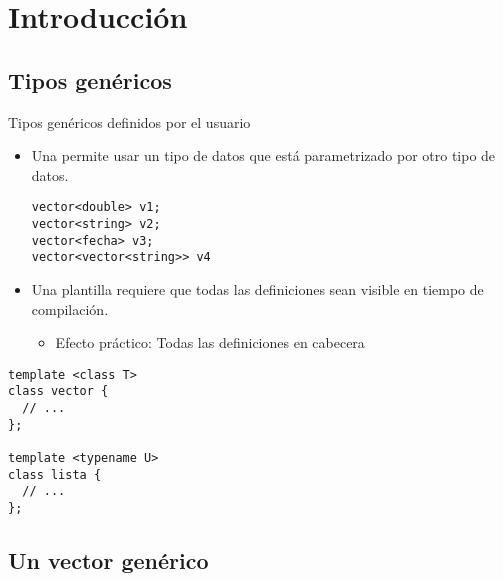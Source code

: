 \section{Introducción}

\subsection{Tipos genéricos}

\begin{frame}[fragile]{Tipos genéricos definidos por el usuario}
\vspace{-0.75em}
\begin{itemize}
  \item Una  permite usar un tipo de datos que está
        parametrizado por otro tipo de datos.
\begin{lstlisting}
vector<double> v1;
vector<string> v2;
vector<fecha> v3;
vector<vector<string>> v4
\end{lstlisting}
  \item Una plantilla requiere que todas las definiciones sean visible en
        tiempo de compilación.
    \begin{itemize}
      \item Efecto práctico: Todas las definiciones en cabecera
    \end{itemize}
\end{itemize}
\begin{lstlisting}
template <class T>
class vector {
  // ...
};

template <typename U>
class lista {
  // ...
};
\end{lstlisting}
\end{frame}

\subsection{Un vector genérico}

